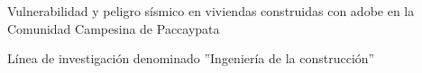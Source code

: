 \newpage
\pagestyle{plain}
\noindent Vulnerabilidad y peligro sísmico en viviendas construidas con adobe en la Comunidad Campesina de Paccaypata\

\noindent Línea de investigación denominado ''Ingeniería de la construcción''
\doclicenseThis%
\newpage
	



